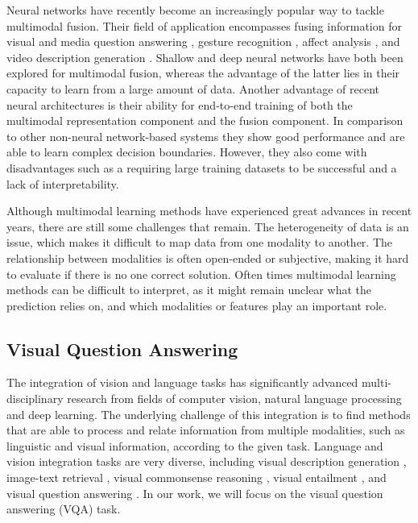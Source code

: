 \documentclass{article}
\begin{document}
Neural networks have recently become an increasingly popular way to tackle multimodal fusion. Their field of application encompasses fusing information for visual and media question answering \citep{gao2015are, malinowski2015ask, xu2016ask}, gesture recognition \citep{neverova2016moddrop}, affect analysis \citep{kahou2015EmoNets,nojavanasghari2016deep}, and video description generation \citep{jin2016video, venugopalan2016improving}. Shallow \citep{gao2015are} and deep \citep{nojavanasghari2016deep, venugopalan2016improving} neural networks have both been explored for multimodal fusion, whereas the advantage of the latter lies in their capacity to learn from a large amount of data. Another advantage of recent neural architectures is their ability for end-to-end training of both the multimodal representation component and the fusion component. In comparison to other non-neural network-based systems they show good performance and are able to learn complex decision boundaries. However, they also come with disadvantages such as a requiring large training datasets to be successful and a lack of interpretability. 

Although multimodal learning methods have experienced great advances in recent years, there are still some challenges that remain. The heterogeneity of data is an issue, which makes it difficult to map data from one modality to another. The relationship between modalities is often open-ended or subjective, making it hard to evaluate if there is no one correct solution. Often times multimodal learning methods can be difficult to interpret, as it might remain unclear what the prediction relies on, and which modalities or features play an important role.

\subsection{Visual Question Answering} \label{subsection:vqa}

The integration of vision and language tasks has significantly advanced multi-disciplinary research from fields of computer vision, natural language processing and deep learning. The underlying challenge of this integration is to find methods that are able to process and relate information from multiple modalities, such as linguistic and visual information, according to the given task. Language and vision integration tasks are very diverse, including visual description generation \citep{plummer2015vdg}, image-text retrieval \citep{wang2016retrieval}, visual commonsense reasoning \citep{zellers2019vcr}, visual entailment \citep{xie2019entailment}, and visual question answering \citep{antol2015vqa}. In our work, we will focus on the visual question answering (VQA) task.
\end{document}
